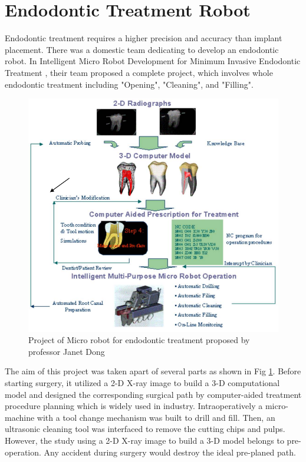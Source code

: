 \section{Endodontic Treatment Robot}
\hspace*{6mm}Endodontic treatment requires a higher precision and accuracy than implant placement. There was a domestic team dedicating to develop an endodontic robot. In Intelligent Micro Robot Development for Minimum Invasive Endodontic Treatment \cite{dong2006wip}\cite{everett2014feasibility}\cite{dong2010design}, their team proposed a complete project, which involves whole endodontic treatment including "Opening", "Cleaning", and "Filling". 
\begin{figure}[htbp]
	\begin{center}
	\includegraphics[width=0.95\linewidth]{Images/NCTU_2.png}
	\caption[Project of Micro robot for endodontic treatment proposed by professor Janet Dong]{Project of Micro robot for endodontic treatment proposed by professor Janet Dong \cite{everett2014feasibility}}	
	\label{fig:NCTU_2}
	\end{center}
\end{figure}
\par
The aim of this project was taken apart of several parts as shown in Fig \ref{fig:NCTU_2}. Before starting surgery, it utilized a 2-D X-ray image to build a 3-D computational model and designed the corresponding surgical path by computer-aided treatment procedure planning which is widely used in industry. Intraoperatively a micro-machine with a tool change mechanism was built to drill and fill. Then, an ultrasonic cleaning tool was interfaced to remove the cutting chips and pulps. However, the study using a 2-D X-ray image to build a 3-D model belongs to pre-operation. Any accident during surgery would destroy the ideal pre-planed path.
